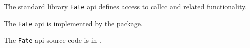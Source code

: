 
The standard library {\tt Fate} api defines access to callcc and related functionality.

The {\tt Fate} api is implemented by the  package.

The {\tt Fate} api source code is in .





